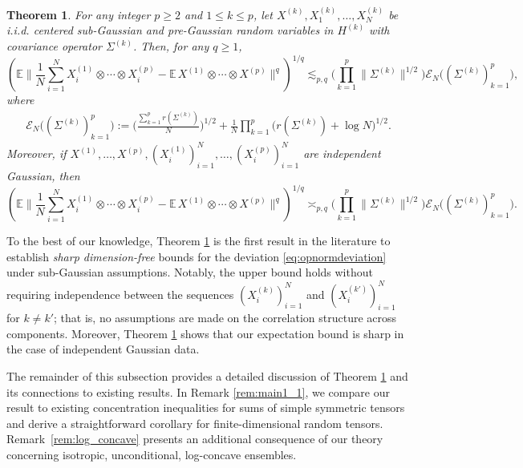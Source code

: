 \documentclass[numbers,webpdf,imaiai]{ima-authoring-template}
\theoremstyle{thmstyletwo}%
\newtheorem{theorem}{Theorem}%
\numberwithin{equation}{section}
\numberwithin{equation}{section}
\newcommand{\E}{\mathbb{E}}
\begin{document}
\begin{theorem}\label{thm:main1}
     For any integer $p\ge 2$ and $1 \leq k \leq p$, let $X^{(k)}, X_1^{(k)}, \ldots, X_N^{(k)}$ be i.i.d. centered sub-Gaussian and pre-Gaussian random variables in $H^{(k)}$ with covariance operator $\Sigma^{(k)}$. Then, for any $q\ge 1$,
\[
\left(\E \bigg\|\frac{1}{N} \sum_{i=1}^N X_i^{(1)} \otimes \cdots \otimes X_i^{(p)}-\E\, X^{(1)} \otimes \cdots \otimes X^{(p)}\bigg\|^q \right)^{1/q} \lesssim_{p,q} \bigg(\prod_{k=1}^p\|\Sigma^{(k)}\|^{1 / 2}\bigg)\mathscr{E}_N\big((\Sigma^{(k)})_{k=1}^p\big),
\]
where
\begin{align*}
\mathscr{E}_N\big((\Sigma^{(k)})_{k=1}^p\big):= \bigg(\frac{\sum_{k=1}^p r(\Sigma^{(k)})}{N}\bigg)^{1/2}+\frac{1}{N}\prod_{k=1}^{p}\Big(r(\Sigma^{(k)})+\log N\Big)^{1/2}.
\end{align*}
Moreover, if $X^{(1)},\ldots, X^{(p)}, (X^{(1)}_i)_{i=1}^{N},\ldots,(X^{(p)}_i)_{i=1}^N$ are independent Gaussian, then
\[
\left(\E \bigg\|\frac{1}{N} \sum_{i=1}^N X_i^{(1)} \otimes \cdots \otimes X_i^{(p)}-\E\, X^{(1)} \otimes \cdots \otimes X^{(p)}\bigg\|^q \right)^{1/q}\asymp_{p,q}\bigg(\prod_{k=1}^p\|\Sigma^{(k)}\|^{1 / 2}\bigg)\mathscr{E}_N\big((\Sigma^{(k)})_{k=1}^p\big).
\]
\end{theorem}


To the best of our knowledge, Theorem \ref{thm:main1} is the first result in the literature to establish \emph{sharp dimension-free} bounds for the deviation \eqref{eq:opnormdeviation} under sub-Gaussian assumptions. Notably, the upper bound holds without requiring independence between the sequences $(X^{(k)}_i)_{i=1}^{N}$ and $(X^{(k')}_i)_{i=1}^{N}$ for $k\ne k'$; that is, no assumptions are made on the correlation structure across components. Moreover, Theorem \ref{thm:main1} shows that our expectation bound is sharp in the case of independent Gaussian data.

The remainder of this subsection provides a detailed discussion of Theorem \ref{thm:main1} and its connections to existing results. In Remark \ref{rem:main1_1}, we compare our result to existing concentration inequalities for sums of simple symmetric tensors and derive a straightforward corollary for finite-dimensional random tensors. Remark~\ref{rem:log_concave} presents an additional consequence of our theory concerning isotropic, unconditional, log-concave ensembles.
\end{document}
